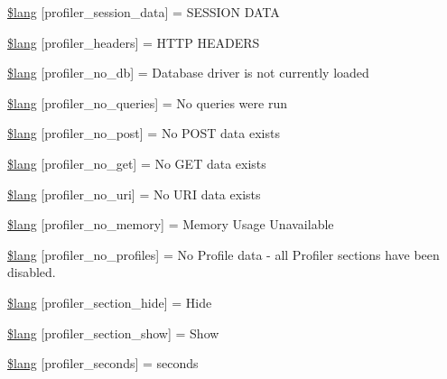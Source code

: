 \begin{DoxyCompactItemize}
\item 
\hyperlink{profiler__lang_8php_a6caa2b856b3211345f4a916febd79a84}{\$lang} \mbox{[}\textquotesingle{}profiler\+\_\+session\+\_\+data\textquotesingle{}\mbox{]} = \textquotesingle{}S\+E\+S\+S\+I\+O\+N D\+A\+T\+A\textquotesingle{}
\item 
\hyperlink{profiler__lang_8php_a079eb6971dec0c6115344e4b621e235f}{\$lang} \mbox{[}\textquotesingle{}profiler\+\_\+headers\textquotesingle{}\mbox{]} = \textquotesingle{}H\+T\+T\+P H\+E\+A\+D\+E\+R\+S\textquotesingle{}
\item 
\hyperlink{profiler__lang_8php_a74da0e429477e757130da70e135d4ae9}{\$lang} \mbox{[}\textquotesingle{}profiler\+\_\+no\+\_\+db\textquotesingle{}\mbox{]} = \textquotesingle{}Database driver is not currently loaded\textquotesingle{}
\item 
\hyperlink{profiler__lang_8php_a783abf2a3410bbc9c32e4b7bb774724b}{\$lang} \mbox{[}\textquotesingle{}profiler\+\_\+no\+\_\+queries\textquotesingle{}\mbox{]} = \textquotesingle{}No queries were run\textquotesingle{}
\item 
\hyperlink{profiler__lang_8php_a06e8171d08be812398060c126233a237}{\$lang} \mbox{[}\textquotesingle{}profiler\+\_\+no\+\_\+post\textquotesingle{}\mbox{]} = \textquotesingle{}No P\+O\+S\+T data exists\textquotesingle{}
\item 
\hyperlink{profiler__lang_8php_a8ecf037acbeb4a7b202b8238c8d1a328}{\$lang} \mbox{[}\textquotesingle{}profiler\+\_\+no\+\_\+get\textquotesingle{}\mbox{]} = \textquotesingle{}No G\+E\+T data exists\textquotesingle{}
\item 
\hyperlink{profiler__lang_8php_ac7d16f2f99b12aeaa609be6bcb89759e}{\$lang} \mbox{[}\textquotesingle{}profiler\+\_\+no\+\_\+uri\textquotesingle{}\mbox{]} = \textquotesingle{}No U\+R\+I data exists\textquotesingle{}
\item 
\hyperlink{profiler__lang_8php_a32345afdaa3f160ba1d21d03223313ad}{\$lang} \mbox{[}\textquotesingle{}profiler\+\_\+no\+\_\+memory\textquotesingle{}\mbox{]} = \textquotesingle{}Memory Usage Unavailable\textquotesingle{}
\item 
\hyperlink{profiler__lang_8php_aabea841eed12fa8271f13656fa7d5457}{\$lang} \mbox{[}\textquotesingle{}profiler\+\_\+no\+\_\+profiles\textquotesingle{}\mbox{]} = \textquotesingle{}No Profile data -\/ all Profiler sections have been disabled.\textquotesingle{}
\item 
\hyperlink{profiler__lang_8php_a137158ebe1d58bd53bbbb4594f2bc0ed}{\$lang} \mbox{[}\textquotesingle{}profiler\+\_\+section\+\_\+hide\textquotesingle{}\mbox{]} = \textquotesingle{}Hide\textquotesingle{}
\item 
\hyperlink{profiler__lang_8php_a3e3b1984f57780efbdaf6d01dac31f3c}{\$lang} \mbox{[}\textquotesingle{}profiler\+\_\+section\+\_\+show\textquotesingle{}\mbox{]} = \textquotesingle{}Show\textquotesingle{}
\item 
\hyperlink{profiler__lang_8php_a6d6060d6ca0da3c1e6d4168914d7e362}{\$lang} \mbox{[}\textquotesingle{}profiler\+\_\+seconds\textquotesingle{}\mbox{]} = \textquotesingle{}seconds\textquotesingle{}
\end{DoxyCompactItemize}


